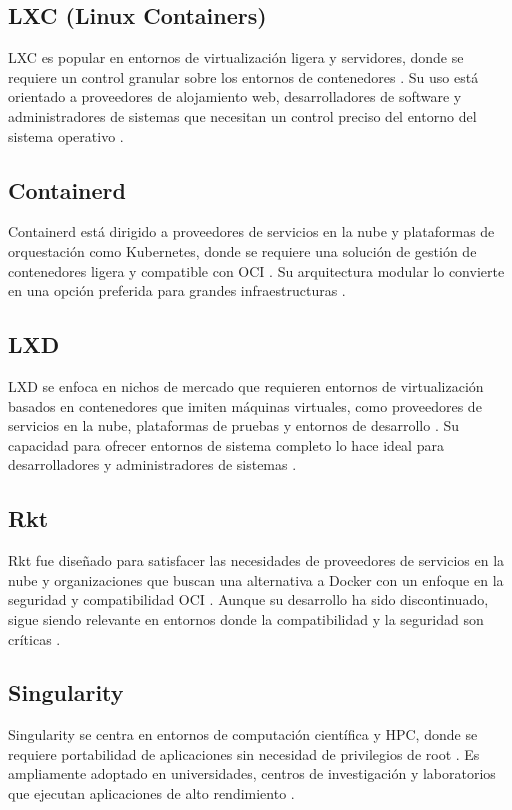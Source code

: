 \subsection{LXC (Linux Containers)}
LXC es popular en entornos de virtualización ligera y servidores, donde se requiere un control granular sobre los entornos de contenedores \citep{Silva2024}. Su uso está orientado a proveedores de alojamiento web, desarrolladores de software y administradores de sistemas que necesitan un control preciso del entorno del sistema operativo \citep{Simon2023}.

\subsection{Containerd}
Containerd está dirigido a proveedores de servicios en la nube y plataformas de orquestación como Kubernetes, donde se requiere una solución de gestión de contenedores ligera y compatible con OCI \citep{Vano2023}. Su arquitectura modular lo convierte en una opción preferida para grandes infraestructuras \citep{Zhou2021}.

\subsection{LXD}
LXD se enfoca en nichos de mercado que requieren entornos de virtualización basados en contenedores que imiten máquinas virtuales, como proveedores de servicios en la nube, plataformas de pruebas y entornos de desarrollo \citep{Silva2024}. Su capacidad para ofrecer entornos de sistema completo lo hace ideal para desarrolladores y administradores de sistemas \citep{Kaiser2022}.

\subsection{Rkt}
Rkt fue diseñado para satisfacer las necesidades de proveedores de servicios en la nube y organizaciones que buscan una alternativa a Docker con un enfoque en la seguridad y compatibilidad OCI \citep{Lingayat2018}. Aunque su desarrollo ha sido discontinuado, sigue siendo relevante en entornos donde la compatibilidad y la seguridad son críticas \citep{Watada2019}.

\subsection{Singularity}
Singularity se centra en entornos de computación científica y HPC, donde se requiere portabilidad de aplicaciones sin necesidad de privilegios de root \citep{10.1145/3332186.3332192}. Es ampliamente adoptado en universidades, centros de investigación y laboratorios que ejecutan aplicaciones de alto rendimiento \citep{Kurtzer2017}.

